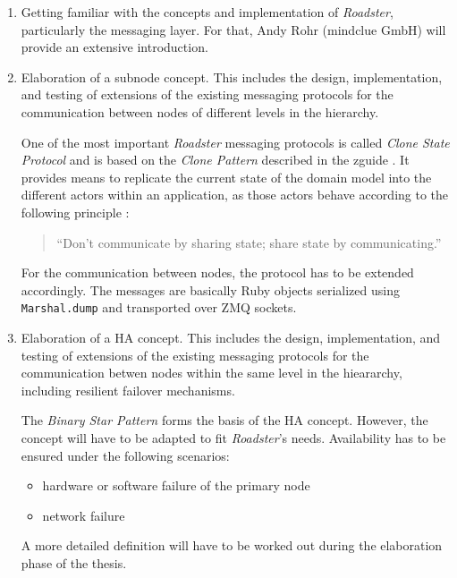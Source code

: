 \documentclass[a4paper]{article}
\newcommand{\rb}[1]{\lstinline[style=customruby]{#1}} %
\begin{document}
\begin{enumerate}
	\item Getting familiar with the concepts and implementation of
		\emph{Roadster}, particularly the messaging layer. For that,
		Andy Rohr (mindclue GmbH) will provide an extensive
		introduction.

	\item Elaboration of a subnode concept. This includes the design,
		implementation, and testing of extensions of the existing
		messaging protocols for the communication between nodes of
		different levels in the hierarchy.

		One of the most important \emph{Roadster} messaging protocols
		is called \emph{Clone State Protocol} and is based on the
		\emph{Clone Pattern} described in the zguide
		\cite{zguide:clone-pattern}. It provides means to replicate the
		current state of the domain model into the different actors
		within an application, as those actors behave according to the
		following principle \cite{igvita:concurrency}:

		\begin{quote}
		``Don't communicate by sharing state; share state by communicating.''
		\end{quote}

		For the communication between nodes, the protocol has to be
		extended accordingly. The messages are basically Ruby objects
		serialized using \rb{Marshal.dump} and transported over ZMQ
		sockets.
		\clearpage

	\item Elaboration of a HA concept. This includes the design,
		implementation, and testing of extensions of the existing
		messaging protocols for the communication betwen nodes within
		the same level in the hieararchy, including resilient failover
		mechanisms.

		The \emph{Binary Star Pattern}
		\cite{zguide:binary-star}\cite{zguide:adding-binary-star} forms
		the basis of the HA concept. However, the concept will have to
		be adapted to fit \emph{Roadster}'s needs. Availability has to
		be ensured under the following scenarios:

		\begin{itemize}
			\item hardware or software failure of the primary node
			\item network failure
		\end{itemize}

		A more detailed definition will have to be worked out during
		the elaboration phase of the thesis.


\end{enumerate}
\end{document}
